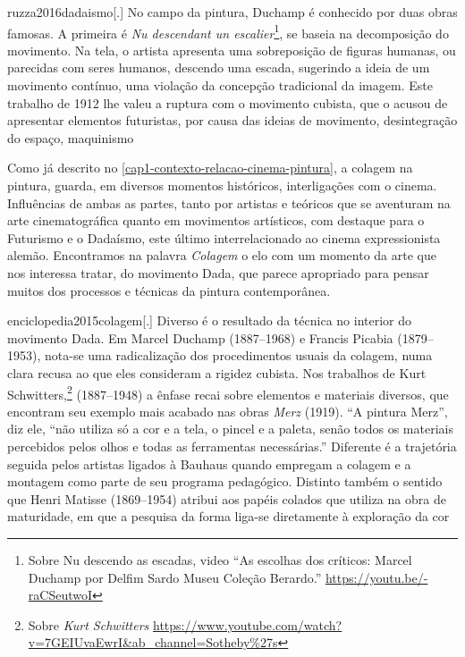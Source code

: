 \begin{displaycquote}[108]{ruzza2016dadaismo}[.]
	No campo da pintura, Duchamp é conhecido por duas obras famosas. A
	primeira é \emph{Nu descendant un escalier}\footnote{%
		Sobre Nu descendo as escadas, video \enquote{As escolhas dos críticos:
			Marcel Duchamp por Delfim Sardo \textbar{} Museu Coleção Berardo.}
		\url{https://youtu.be/-raCSeutwoI}}, se baseia na decomposição do
	movimento. Na tela, o artista apresenta uma sobreposição de figuras
	humanas, ou parecidas com seres humanos, descendo uma escada, sugerindo
	a ideia de um movimento contínuo, uma violação da concepção tradicional
	da imagem. Este trabalho de 1912 lhe valeu a ruptura com o movimento
	cubista, que o acusou de apresentar elementos futuristas, por causa das
	ideias de movimento, desintegração do espaço, maquinismo
\end{displaycquote}

Como já descrito no \cref{cap1-contexto-relacao-cinema-pintura}, a colagem
na pintura, guarda, em
diversos momentos históricos, interligações com o cinema. Influências
de ambas as partes, tanto por artistas e teóricos que se aventuram na
arte cinematográfica quanto em movimentos artísticos, com destaque para
o Futurismo e o Dadaísmo, este último interrelacionado ao cinema
expressionista alemão. Encontramos na palavra \emph{Colagem} o elo com
um momento da arte que nos interessa tratar, do movimento Dada, que
parece apropriado para pensar muitos dos processos e técnicas da
pintura contemporânea.

\begin{displaycquote}{enciclopedia2015colagem}[.]
	Diverso é o resultado da técnica no interior do movimento Dada. Em
	Marcel Duchamp (1887--1968) e Francis Picabia (1879--1953), nota-se uma
	radicalização dos procedimentos usuais da colagem, numa clara recusa ao
	que eles consideram a rigidez cubista. Nos trabalhos de Kurt
	Schwitters,\footnote{Sobre \emph{Kurt Schwitters}
		\url{https://www.youtube.com/watch?v=7GEIUvaEwrI\&ab\_channel=Sotheby\%27s}}
	(1887--1948) a ênfase recai sobre elementos e materiais diversos, que
	encontram seu exemplo mais acabado nas obras \emph{Merz} (1919). \enquote{A
		pintura Merz}, diz ele, \enquote{não utiliza só a cor e a tela, o pincel e a
		paleta, senão todos os materiais percebidos pelos olhos e todas as
		ferramentas necessárias.} \textelp{} Diferente é a trajetória seguida
	pelos artistas ligados à Bauhaus quando empregam a colagem e a montagem
	como parte de seu programa pedagógico. Distinto também o sentido que
	Henri Matisse (1869--1954) atribui aos papéis colados que utiliza na obra
	de maturidade, em que a pesquisa da forma liga-se diretamente à
	exploração da cor
\end{displaycquote}

